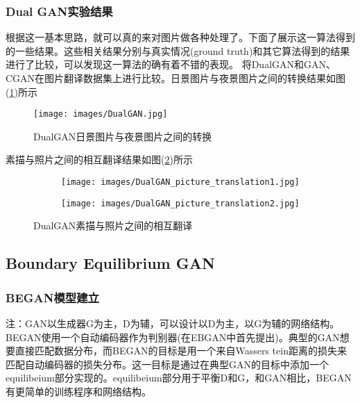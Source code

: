         \subsubsection{Dual GAN实验结果}
            \par
            根据这一基本思路，就可以真的来对图片做各种处理了。下面了展示这一算法得到的一些结果。这些相关结果分别与真实情况(ground truth)和其它算法得到的结果进行了比较，可以发现这一算法的确有着不错的表现。
            将DualGAN和GAN、CGAN在图片翻译数据集上进行比较。日景图片与夜景图片之间的转换结果如图(\ref{fig:DualGAN日景图片与夜景图片之间的转换})所示
                \begin{figure}[H]
                \centering
                \texttt{[image: images/DualGAN.jpg]}
                \caption{DualGAN日景图片与夜景图片之间的转换}
                \label{fig:DualGAN日景图片与夜景图片之间的转换}
                \end{figure}
            素描与照片之间的相互翻译结果如图(\ref{fig:DualGAN素描与照片之间的相互翻译})所示
            \begin{figure}[H]
            \centering
            \begin{subfigure}[b]{0.4\textwidth}
            \texttt{[image: images/DualGAN\_picture\_translation1.jpg]}
            \caption{}
            \end{subfigure}
            \begin{subfigure}[b]{0.4\textwidth}
            \texttt{[image: images/DualGAN\_picture\_translation2.jpg]}
            \caption{}
            \end{subfigure}
            \caption{DualGAN素描与照片之间的相互翻译}
            \label{fig:DualGAN素描与照片之间的相互翻译}
            \end{figure}

    \subsection{Boundary Equilibrium GAN}
        \subsubsection{BEGAN模型建立}
            \par
            注：GAN以生成器G为主，D为辅，可以设计以D为主，以G为辅的网络结构。
            BEGAN\cite{2017.David}使用一个自动编码器作为判别器(在EBGAN\cite{2016.Junbo}中首先提出)。典型的GAN想要直接匹配数据分布，而BEGAN的目标是用一个来自Wassers tein距离的损失来匹配自动编码器的损失分布。这一目标是通过在典型GAN的目标中添加一个equilibeium部分实现的。equilibeium部分用于平衡D和G，和GAN相比，BEGAN有更简单的训练程序和网络结构。
